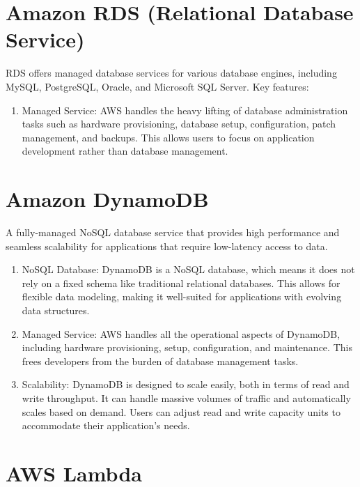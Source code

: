 \documentclass[11pt,a4paper,oneside]{report}
\begin{document}
\section{Amazon RDS (Relational Database Service)}

RDS offers managed database services for various database engines, including MySQL, PostgreSQL, Oracle, and Microsoft SQL Server.
Key features:
\begin{enumerate}
  \item Managed Service: AWS handles the heavy lifting of database administration tasks such as hardware provisioning, database setup, configuration, patch management, and backups. This allows users to focus on application development rather than database management.
\end{enumerate}


\section{Amazon DynamoDB}

A fully-managed NoSQL database service that provides high performance and seamless scalability for applications that require low-latency access to data.
\begin{enumerate}
  \item NoSQL Database: DynamoDB is a NoSQL database, which means it does not rely on a fixed schema like traditional relational databases. This allows for flexible data modeling, making it well-suited for applications with evolving data structures.
  \item Managed Service: AWS handles all the operational aspects of DynamoDB, including hardware provisioning, setup, configuration, and maintenance. This frees developers from the burden of database management tasks.
  \item Scalability: DynamoDB is designed to scale easily, both in terms of read and write throughput. It can handle massive volumes of traffic and automatically scales based on demand. Users can adjust read and write capacity units to accommodate their application's needs.
\end{enumerate}
\section{AWS Lambda}
\end{document}
